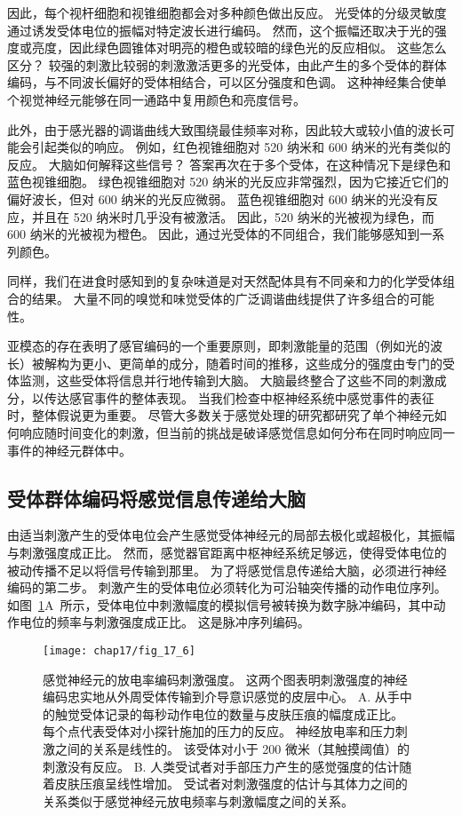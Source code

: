 因此，每个视杆细胞和视锥细胞都会对多种颜色做出反应。 
光受体的分级灵敏度通过诱发受体电位的振幅对特定波长进行编码。 
然而，这个振幅还取决于光的强度或亮度，因此绿色圆锥体对明亮的橙色或较暗的绿色光的反应相似。 
这些怎么区分？ 
较强的刺激比较弱的刺激激活更多的光受体，由此产生的多个受体的群体编码，与不同波长偏好的受体相结合，可以区分强度和色调。 
这种神经集合使单个视觉神经元能够在同一通路中复用颜色和亮度信号。


此外，由于感光器的调谐曲线大致围绕最佳频率对称，因此较大或较小值的波长可能会引起类似的响应。 
例如，红色视锥细胞对 520 纳米和 600 纳米的光有类似的反应。
大脑如何解释这些信号？
答案再次在于多个受体，在这种情况下是绿色和蓝色视锥细胞。
绿色视锥细胞对 520 纳米的光反应非常强烈，因为它接近它们的偏好波长，但对 600 纳米的光反应微弱。
蓝色视锥细胞对 600 纳米的光没有反应，并且在 520 纳米时几乎没有被激活。
因此，520 纳米的光被视为绿色，而 600 纳米的光被视为橙色。
因此，通过光受体的不同组合，我们能够感知到一系列颜色。


同样，我们在进食时感知到的复杂味道是对天然配体具有不同亲和力的化学受体组合的结果。 
大量不同的嗅觉和味觉受体的广泛调谐曲线提供了许多组合的可能性。


亚模态的存在表明了感官编码的一个重要原则，即刺激能量的范围（例如光的波长）被解构为更小、更简单的成分，随着时间的推移，这些成分的强度由专门的受体监测，这些受体将信息并行地传输到大脑。
大脑最终整合了这些不同的刺激成分，以传达感官事件的整体表现。 
当我们检查中枢神经系统中感觉事件的表征时，整体假说更为重要。 
尽管大多数关于感觉处理的研究都研究了单个神经元如何响应随时间变化的刺激，但当前的挑战是破译感觉信息如何分布在同时响应同一事件的神经元群体中。


\subsection{受体群体编码将感觉信息传递给大脑}

由适当刺激产生的受体电位会产生感觉受体神经元的局部去极化或超极化，其振幅与刺激强度成正比。
然而，感觉器官距离中枢神经系统足够远，使得受体电位的被动传播不足以将信号传输到那里。
为了将感觉信息传递给大脑，必须进行神经编码的第二步。
刺激产生的受体电位必须转化为可沿轴突传播的动作电位序列。
如图~\ref{fig:17_6}A~所示，受体电位中刺激幅度的模拟信号被转换为数字脉冲编码，其中动作电位的频率与刺激强度成正比。
这是脉冲序列编码。


\begin{figure}[htbp]
	\centering
	\texttt{[image: chap17/fig\_17\_6]}
	\caption{感觉神经元的放电率编码刺激强度。 
		这两个图表明刺激强度的神经编码忠实地从外周受体传输到介导意识感觉的皮层中心\cite{mountcastle1966neural}。
		A. 从手中的触觉受体记录的每秒动作电位的数量与皮肤压痕的幅度成正比。 
		每个点代表受体对小探针施加的压力的反应。 
		神经放电率和压力刺激之间的关系是线性的。 
		该受体对小于 200 微米（其触摸阈值）的刺激没有反应。 
		B. 人类受试者对手部压力产生的感觉强度的估计随着皮肤压痕呈线性增加。 
		受试者对刺激强度的估计与其体力之间的关系类似于感觉神经元放电频率与刺激幅度之间的关系。}
	\label{fig:17_6}
\end{figure}



